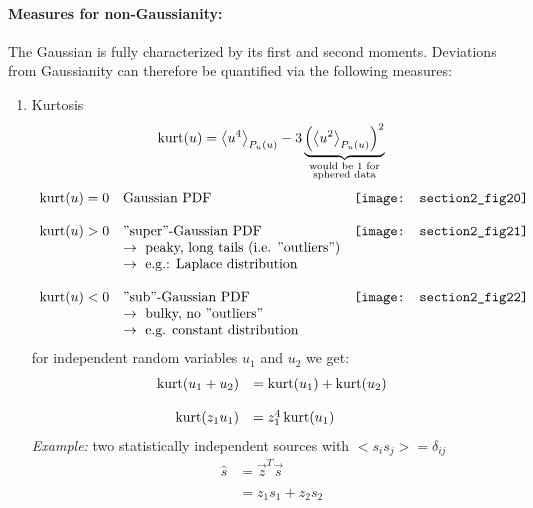 \paragraph{Measures for non-Gaussianity:} The Gaussian is fully characterized by its first and second moments. Deviations from Gaussianity can therefore be quantified via the following measures:
\begin{enumerate}[(1)]
\item Kurtosis
\begin{equation}
	\operatorname{kurt}(u) = \big< u^4 \big>_{P_u (u)} - 3 \underbrace{
		\Big( \big< u^2 \big>_{P_u (u)} \Big)^2 }_{
			\substack{	\text{would be } 1 \text{ for} \\
					\text{sphered data}}}
\end{equation}
\[ \begin{array}{lll}
	\operatorname{kurt}(u) = 0 & \text{Gaussian PDF} 
		& \texttt{[image: section2\_fig20]}
		\\\\
	\operatorname{kurt}(u) > 0 & \text{''super''-Gaussian PDF}		
		& \texttt{[image: section2\_fig21]} \\
		& \rightarrow \text{ peaky, long tails (i.e. ''outliers'')} \\
		& \rightarrow \text{ e.g.: Laplace distribution} \\\\
	\operatorname{kurt}(u) < 0 & \text{''sub''-Gaussian PDF}
		& \texttt{[image: section2\_fig22]} \\
		& \rightarrow \text{ bulky, no ''outliers''} \\
		& \rightarrow \text{ e.g. constant distribution}
\end{array} \]
for independent random variables $u_1$ and $u_2$ we get:
\begin{equation}
	\begin{array}{rl}
		\operatorname{kurt}(u_1 + u_2) 
			& = \operatorname{kurt}(u_1) + \operatorname{kurt}(u_2) \\\\
		\operatorname{kurt}(z_1 u_1)
			& = z_1^4 \operatorname{kurt}(u_1)
	\end{array}
\end{equation}
\emph{Example:} two statistically independent sources with $\big< s_i s_j \big> = \delta_{ij}$
\begin{equation}
	\begin{array}{ll}
		\widehat{s} & = \vec{z}^T \vec{s} \\\\
			    & = z_1 s_1 + z_2 s_2
	\end{array}

\end{equation}
\end{enumerate}
